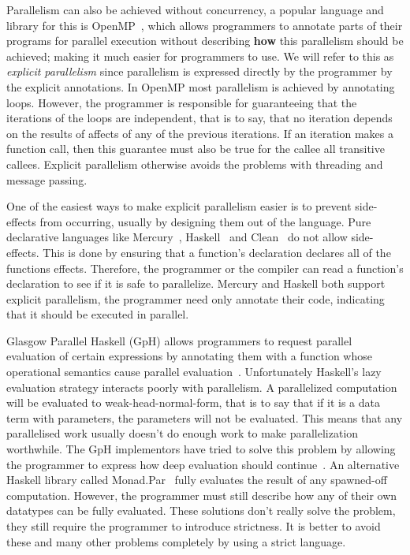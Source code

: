 Parallelism can also be achieved without concurrency,
a popular language and library for this is OpenMP~\citep{openmp},
which allows programmers to annotate parts of their programs for parallel
execution without describing \textbf{how} this parallelism should be achieved;
making it much easier for programmers to use.
We will refer to this as \emph{explicit parallelism}
since parallelism is expressed directly by the programmer by the explicit
annotations.
In OpenMP most parallelism is achieved by annotating loops.
However,
the programmer is responsible for guaranteeing that the iterations of the loops
are independent,
that is to say, that no iteration depends on the results of affects of any of
the previous iterations.
If an iteration makes a function call, then this guarantee must also be true for
the callee all transitive callees.
Explicit parallelism otherwise avoids the problems with threading and message
passing.

One of the easiest ways to make explicit parallelism easier is to prevent
side-effects from occurring, usually by designing them out of the language.
Pure declarative languages like Mercury~\citep{mercury_jlp},
Haskell~\citep{haskell98} and Clean~\citep{1991:concurrent-clean} do not
allow side-effects.
This is done by ensuring that a function's declaration declares all of the
functions effects.
Therefore,
the programmer or the compiler can read a function's declaration to see if it
is safe to parallelize.
Mercury and Haskell both support explicit parallelism,
the programmer need only annotate their code, indicating that it should be
executed in parallel.

Glasgow Parallel Haskell (GpH) allows programmers to request parallel
evaluation of certain expressions by annotating them with a function
whose operational semantics cause parallel
evaluation~\citep{gph,loidi:2008:gph-semiexplicit-parallelism}.
Unfortunately Haskell's lazy evaluation strategy interacts poorly with
parallelism.
A parallelized computation will be evaluated to weak-head-normal-form,
that is to say that if it is a data term with parameters,
the parameters will not be evaluated.
This means that any parallelised work usually doesn't do enough work to
make parallelization worthwhile.
The GpH implementors have tried to solve this problem by allowing
the programmer to express how deep evaluation should
continue~\citep{trinder:98:strategies}.
An alternative Haskell library called Monad.Par~\citep{marlow:monadpar}
fully evaluates the result of any spawned-off computation.
However, the programmer must still describe how any of their own
datatypes can be fully evaluated.
These solutions don't really solve the problem,
they still require the programmer to introduce strictness.
It is better to avoid these and many other problems completely by using
a strict language.

